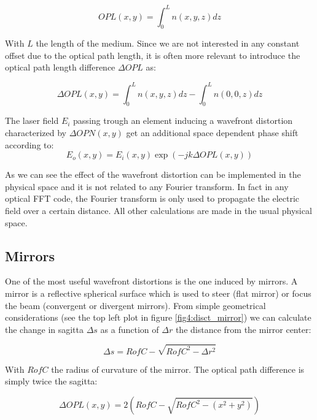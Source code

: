\begin{equation}
OPL(x,y) = \int_0^L n(x,y,z) dz
\end{equation}

With $L$ the length of the medium. Since we are not interested in any constant offset due to the optical path length, it is often more relevant to introduce the optical path length difference $\Delta OPL$ as:

\begin{equation}
\Delta OPL(x,y) = \int_0^L n(x,y,z) dz - \int_0^L n(0,0,z) dz
\end{equation}

The laser field $E_i$ passing trough an element inducing a wavefront distortion characterized by $\Delta OPN(x,y)$ get an additional space dependent phase shift according to:
\begin{equation}
E_o(x,y) = E_i(x,y) \exp{(-j k \Delta OPL(x,y))}
\label{eq1:mir_ref}
\end{equation}

As we can see the effect of the wavefront distortion can be implemented in the physical space and it is not related to any Fourier transform. In fact in any optical FFT code, the Fourier transform is only used to propagate the electric field  over a certain distance. All other calculations are made in the usual physical space.

\subsection{Mirrors}
\label{sec1:3:2}

One of the most useful wavefront distortions is the one induced by mirrors. A mirror is a reflective spherical surface which is used to steer (flat mirror) or focus the beam (convergent or divergent mirrors). From simple geometrical considerations (see the top left plot in figure \ref{fig4:disct_mirror}) we can calculate the change in sagitta $\Delta s$ as a function of $ \Delta r$ the distance from the mirror center:

\begin{equation}
\Delta s = RofC - \sqrt{RofC^2 - \Delta r^2}
\end{equation}

With $RofC$ the radius of curvature of the mirror. The optical path difference is simply twice the sagitta:

\begin{equation}
\Delta OPL(x,y) = 2\left(RofC - \sqrt{RofC^2 - (x^2+y^2)}\right)
\label{eq1:mir_ref_OPN}
\end{equation}



